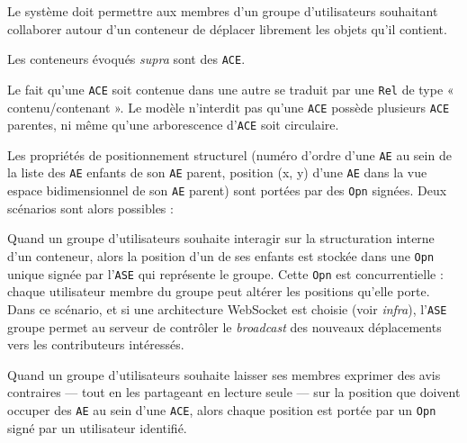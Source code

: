\exig{}
Le système doit permettre aux membres d'un groupe d'utilisateurs souhaitant collaborer autour d'un conteneur de déplacer librement les objets qu'il contient.

\startsection[title={Éléments de modélisation}]

Les conteneurs évoqués {\it supra} sont des {\tt ACE}.

Le fait qu'une {\tt ACE} soit contenue dans une autre se traduit par une {\tt Rel} de type « contenu/contenant ».
Le modèle n'interdit pas qu'une {\tt ACE} possède plusieurs {\tt ACE} parentes, ni même qu'une arborescence d'{\tt ACE} soit circulaire.

Les propriétés de positionnement structurel (numéro d'ordre d'une {\tt AE} au sein de la liste des {\tt AE} enfants de son {\tt AE} parent, position (x, y) d'une {\tt AE} dans la vue espace bidimensionnel de son {\tt AE} parent) sont portées par des {\tt Opn} signées.
Deux scénarios sont alors possibles :

\startitemize
	\item
	Quand un groupe d'utilisateurs souhaite interagir sur la structuration interne d'un conteneur, alors la position d'un de ses enfants est stockée dans une {\tt Opn} unique signée par l'{\tt ASE} qui représente le groupe.
	Cette {\tt Opn} est concurrentielle : chaque utilisateur membre du groupe peut altérer les positions qu'elle porte.
	Dans ce scénario, et si une architecture WebSocket est choisie (voir {\it infra}), l'{\tt ASE} groupe permet au serveur de contrôler le {\it broadcast} des nouveaux déplacements vers les contributeurs intéressés.
	\item
	Quand un groupe d'utilisateurs souhaite laisser ses membres exprimer des avis contraires --- tout en les partageant en lecture seule --- sur la position que doivent occuper des {\tt AE} au sein d'une {\tt ACE}, alors chaque position est portée par un {\tt Opn} signé par un utilisateur identifié.
\stopitemize

\startsection[title={Éléments d'implémentation}]

